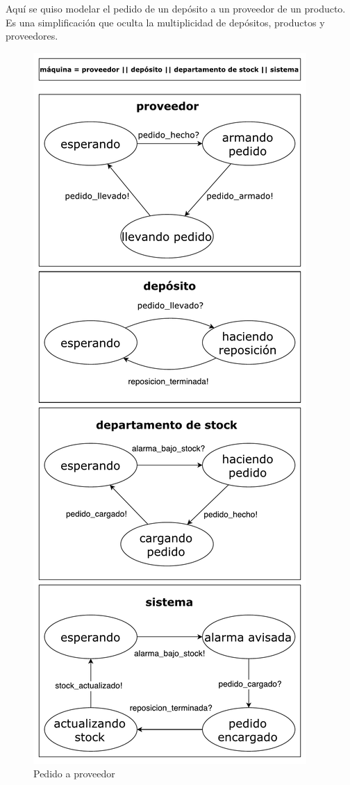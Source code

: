Aquí se quiso modelar el pedido de un depósito a un proveedor de un producto.
Es una simplificación que oculta la multiplicidad de depósitos, productos y
proveedores.

\begin{figure}[H]
  \begin{center}
  \includegraphics[height=.8\textheight]{tp2/images/fsm-pedido-a-proveedor.pdf}
  \end{center}
  \caption{Pedido a proveedor}
  \label{fsm:proveedor}
\end{figure}
